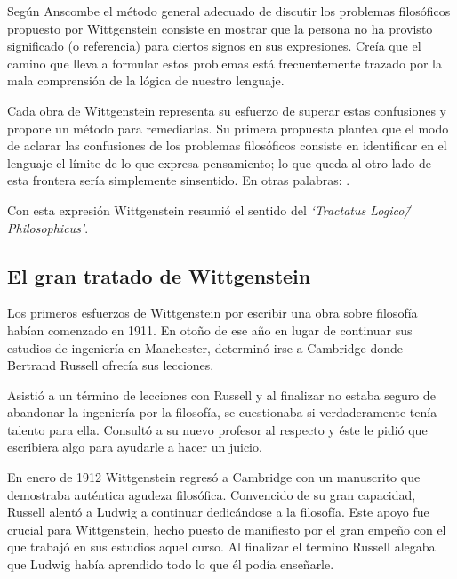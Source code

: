 Según Anscombe el método general adecuado de discutir los problemas filosóficos
propuesto por Wittgenstein consiste en mostrar que la persona no ha provisto
significado (o referencia) para ciertos signos en sus expresiones.\autocite[cf.
p. 151]{IWT} Creía que el camino que lleva a formular estos problemas está
frecuentemente trazado por la mala comprensión de la lógica de nuestro lenguaje.

Cada obra de Wittgenstein representa su esfuerzo de superar estas confusiones
y propone un método para remediarlas. Su primera propuesta plantea que el modo
de aclarar las confusiones de los problemas filosóficos consiste en
identificar en el lenguaje el límite de lo que expresa pensamiento; lo que
queda al otro lado de esta frontera sería simplemente sinsentido. En otras
palabras: .
\autocite[prefacio]{tractatus}

Con esta expresión Wittgenstein resumió el sentido del \emph{`Tractatus
Logico\=/Philosophicus'}.

\subsection{El gran tratado de Wittgenstein}

Los primeros esfuerzos de Wittgenstein por escribir una obra sobre filosofía
habían comenzado en 1911. En otoño de ese año en lugar de continuar sus estudios
de ingeniería en Manchester, determinó irse a Cambridge donde Bertrand Russell
ofrecía sus lecciones.

Asistió a un término de lecciones con Russell y al finalizar no estaba seguro de
abandonar la ingeniería por la filosofía, se cuestionaba si verdaderamente tenía
talento para ella. Consultó a su nuevo profesor al respecto y éste le pidió que
escribiera algo para ayudarle a hacer un juicio.

En enero de 1912 Wittgenstein regresó a Cambridge con un manuscrito que
demostraba auténtica agudeza filosófica. Convencido de su gran capacidad,
Russell alentó a Ludwig a continuar dedicándose a la filosofía. Este apoyo fue
crucial para Wittgenstein, hecho puesto de manifiesto por el gran empeño con el
que trabajó en sus estudios aquel curso. Al finalizar el termino Russell alegaba
que Ludwig había aprendido todo lo que él podía enseñarle.\autocite[cap. 3 loc
865]{monk1991duty}


